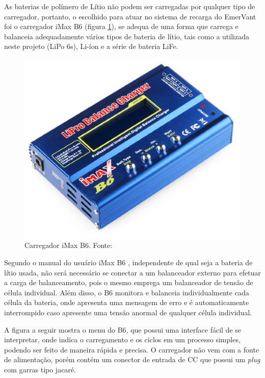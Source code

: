 As baterias de polímero de Lítio não podem ser carregadas por qualquer tipo de carregador, portanto, o escolhido para atuar no sistema de recarga do EmerVant foi o carregador iMax B6 (figura \ref{fig:carregador1}), se adequa de uma forma que carrega e balanceia adequadamente vários tipos de bateria de lítio, tais como a utilizada neste projeto (LiPo 6s), Li-íon e a série de bateria LiFe.


 \begin{figure}[h!]
    \centering
	\includegraphics[keepaspectratio=true,scale=0.4]{figuras/carregador1.eps}
    \caption{Carregador iMax B6. Fonte: \cite{carregador1}}
    \label{fig:carregador1}
\end{figure}


Segundo o manual do usuário iMax B6 \cite{ibmax}, independente de qual seja a bateria de lítio usada, não será necessário se conectar a um balanceador externo para efetuar a carga de balanceamento, pois o mesmo emprega um balanceador de tensão de célula individual. Além disso, o B6 monitora e balanceia individualmente cada célula da bateria, onde apresenta uma mensagem de erro e é automaticamente interrompido caso apresente uma tensão anormal de qualquer célula individual. 

A figura a seguir mostra o menu do B6, que possui uma interface fácil de se interpretar, onde indica o carregamento e os ciclos em um processo simples, podendo ser feito de maneira rápida e precisa. O carregador não vem com a fonte de alimentação, porém contém um conector de entrada de CC que possui um \textit{plug} com garras tipo jacaré.

